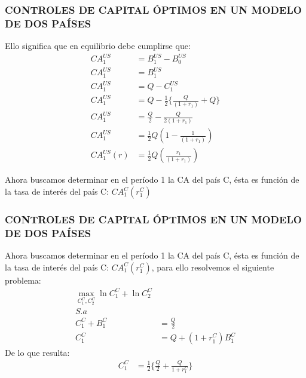 \documentclass[10pt, xcolor=table, x11names]{beamer}
\begin{document}
\begin{frame}[label=5]
	\frametitle{{\normalsize CONTROLES DE CAPITAL ÓPTIMOS EN UN MODELO DE DOS PAÍSES} {}}
	Ello significa que en equilibrio debe cumplirse que:
	\begin{align}
	CA_{1}^{US}&=B_{1}^{US}-B_{0}^{US}\nonumber \\
	CA_{1}^{US}&=B_{1}^{US}\nonumber \\
	CA_{1}^{US}&=Q-C_{1}^{US}\nonumber \\
	CA_{1}^{US}&=Q-\frac{1}{2}\{\frac{Q}{(1+r_{1})}+Q\}\nonumber \\
	CA_{1}^{US}&=\frac{Q}{2}-\frac{Q}{2(1+r_{1})}\nonumber \\
	CA_{1}^{US}&=\frac{1}{2}Q(1-\frac{1}{(1+r_{1})})\nonumber \\
	CA_{1}^{US}(r)&=\frac{1}{2}Q(\frac{r_{1}}{(1+r_{1})})
	\end{align}

Ahora buscamos determinar en el período 1 la CA del país C, ésta es función de la tasa de interés del país C: $CA_{1}^{C}(r_{1}^{C}) $
\end{frame}

\begin{frame}[label=5]
	\frametitle{{\normalsize CONTROLES DE CAPITAL ÓPTIMOS EN UN MODELO DE DOS PAÍSES} {}}
Ahora buscamos determinar en el período 1 la CA del país C, ésta es función de la tasa de interés del país C: $CA_{1}^{C}(r_{1}^{C}) $, para ello resolvemos el siguiente problema:
\begin{align}
\max_{C_{1}^{C}, C_{2}^{C}}\ln{C_{1}^{C}} + \ln{C_{2}^{C}}\nonumber \\
S.a \nonumber \\
C_{1}^{C}+B_{1}^{C}&=\frac{Q}{2}\nonumber \\
C_{1}^{C}&=Q+(1+r_{1}^{C})B_{1}^{C}\nonumber 
\end{align}
De lo que resulta:
\begin{align}
C_{1}^{C}&=\frac{1}{2}\{\frac{Q}{2}+\frac{Q}{1+r_{1}^{C}}\}
\end{align}

\end{frame}
\end{document}
